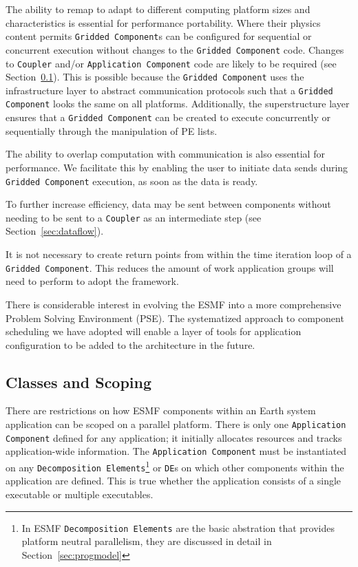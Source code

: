 The ability to remap to adapt to different computing platform sizes 
and characteristics is essential for performance portability.
Where their physics content permits
{\tt Gridded Component}s can be configured for
sequential or concurrent execution without changes to the {\tt Gridded 
Component} code.  Changes to {\tt Coupler} and/or {\tt Application Component} code are likely to 
be required (see Section~\ref{sec:scoping}). This is possible because 
the {\tt Gridded Component} uses the infrastructure layer to abstract communication
protocols such that a {\tt Gridded Component} looks the same on all
platforms. Additionally, the superstructure layer ensures that a {\tt Gridded
Component} can be created to execute concurrently or sequentially through the
manipulation of PE lists.

The ability to overlap computation with communication is also essential for
performance.  We facilitate this by enabling the user to initiate data 
sends during {\tt Gridded Component} execution, as soon as the data is ready.

To further increase efficiency, data may be sent between components without 
needing to be sent to a {\tt Coupler} as an intermediate step (see
Section~\ref{sec:dataflow}).

It is not necessary to create return points from 
within the time iteration loop of a {\tt Gridded Component}.  This reduces the
amount of work application groups will need to perform to adopt the 
framework.

There is considerable interest in evolving the ESMF into a more comprehensive
Problem Solving Environment (PSE).  The systematized approach to component 
scheduling we have adopted will enable a layer of tools for application 
configuration to be added to the architecture in the future.

\subsection{Classes and Scoping}
\label{sec:scoping}
There are restrictions on how ESMF components within an Earth system application 
can be scoped on a parallel platform.  There is only one {\tt Application Component} 
defined for any application; it initially allocates resources and tracks 
application-wide information. 
The {\tt Application Component} must be instantiated on 
any {\tt Decomposition Elements}\footnote{In ESMF {\tt Decomposition Elements} are the
basic abstration that provides platform neutral parallelism, they are discussed in detail
in Section~\ref{sec:progmodel}} or {\tt DE}s on 
which other components
within the application are defined.  This is true whether the 
application consists of a single executable or multiple 
executables.  

